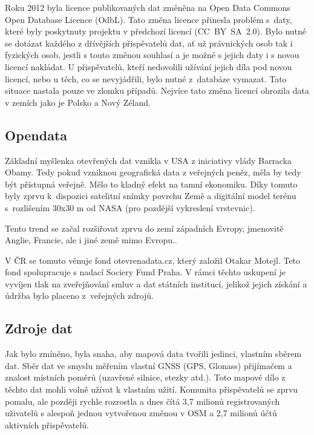 Roku 2012 byla licence publikovaných dat změněna na Open Data Commons 
Open Database Licence (OdbL). Tato změna licence přinesla problém 
s~daty, které byly poskytnuty projektu v předchozí licencí 
(CC­~BY~SA~2.0). Bylo nutné se dotázat každého z dřívějších 
přispěvatelů dat, ať už právnických osob tak i fyzických osob, jestli 
s touto změnou souhlasí a je možné s jejich daty i s novou licencí 
nakládat. U přispěvatelů, kteří nedovolili užívání jejich díla 
pod novou licencí, nebo u těch, co se nevyjádřili, bylo nutné 
z~databáze vymazat. Tato situace nastala pouze ve zlomku případů. 
Nejvíce tato změna licencí ohrozila data v zemích jako je Polsko a Nový Zéland.
\cite {OSMlicenceIssue} 

\subsection{Opendata}
\label{opendata}
Základní myšlenka otevřených dat vznikla v USA z iniciativy vlády Barracka Obamy. 
Tedy pokud vzniknou geografická data z veřejných peněz, měla by tedy být 
přístupná veřejně. Mělo to kladný efekt na tamní ekonomiku. Díky tomuto byly 
zprvu k~dispozici satelitní snímky povrchu Země a digitální model terénu 
s~rozlišením 30x30 m od NASA (pro pozdější vykreslení vrstevnic). 

Tento trend se začal rozšiřovat zprvu do zemí západních Evropy,
jmenovitě Anglie, Francie, ale i jiné země mimo Evropu..  

V ČR se tomuto věnuje fond otevrenadata.cz, který založil Otakar 
Motejl. Teto fond spolupracuje s nadací Sociery Fund Praha. V rámci 
těchto uskupení je vyvíjen tlak na zveřejňování smluv a dat 
státních institucí, jelikož jejich získání a údržba bylo placeno 
z~veřejných zdrojů.

\subsection{Zdroje dat}
\label{opendata}

Jak bylo zmíněno, byla snaha, aby mapová data tvořili jedinci, vlastním 
sběrem dat. Sběr dat ve smyslu měřením vlastní GNSS (GPS, Glonass) 
přijímačem a znalost místních poměrů (uzavřené silnice, stezky atd.). 
Toto mapové dílo z těchto dat mohli volně užívat k vlastním užití. 
Komunita přispěvatelů se zprvu pomalu, ale později rychle rozrostla a 
dnes čítá 3,7 milionů registrovaných uživatelů s alespoň jednou 
vytvořenou změnou v OSM a 2,7 milionů účtů aktivních přispěvatelů. \cite{OSMstats}

